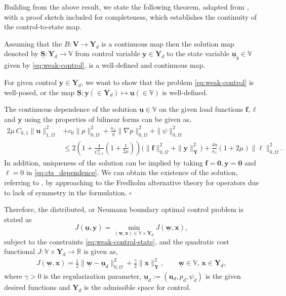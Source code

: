 \documentclass[smallextended]{svjour3}
\renewenvironment{proof}{\noindent{\it Proof.}}{\hfill$\square$}
\numberwithin{equation}{section}
\numberwithin{figure}{section}
\numberwithin{table}{section}
\newcommand{\buS}{\underline{\boldsymbol{S}}}
\newcommand\cero{{\boldsymbol{0}}}
\newcommand\bV{\mathbf{V}}
\newcommand\ff{\boldsymbol{f}}
\newcommand\buu{\underline{\boldsymbol{u}}}
\newcommand\buw{\underline{\boldsymbol{w}}}
\newcommand\bx{\boldsymbol{x}}
\newcommand\by{\boldsymbol{y}}
\newcommand\bu{\boldsymbol{u}}
\newcommand{\bYd}{\boldsymbol{Y}_d}
\newcommand{\bY}{\boldsymbol{Y}}
\newcommand{\bbV}{\mathbb{V}}
\newcommand{\bbR}{\mathbb{R}}
\begin{document}
	

		
	\noindent Building from the above result, we state the following theorem, adapted from \cite{or_sinum16,burger_acom21}, with a proof sketch included for completeness, which establishes the continuity of the control-to-state map.
	\begin{theorem} \label{thm:Gwelldefined}
	Assuming that the $B: \bV \to \bYd$ is a continuous map then the solution map denoted by $\buS: \bYd\to \bbV $ from control variable $\by \in \bYd$ to the state variable $\buu_y \in \bbV$ given by \eqref{eq:weak-control}, is a well-defined and continuous map.
	\end{theorem}
	\begin{proof}
		For given control $\by \in \bYd$, we want to show that the problem \eqref{eq:weak-control} is well-posed, or
        the map $\buS: \by (\in \bYd) \mapsto \buu (\in \bbV)$ is well-defined.
		
		The continuous dependence of the solution $\buu \in \bbV$ on the given load functions $\ff, \ell$ and $\by$ using the properties of bilinear forms can be given as,
		\begin{equation} \label{eq:cts_dependence}
			\begin{aligned}
			2 \mu \, C_{k,1} \| \bu \|_{1, \Omega}^2 &+  c_0 \| p \|_{0, \Omega}^2 + \frac{\kappa_1}{\eta} \| \nabla p \|_{0, \Omega}^2 + \| \psi\|_{0, \Omega}^2 \\
			& \le  2 \left( 1+ \frac{4}{C_{k,1}^2} \left( 1+ \frac{1}{2 \mu} \right)\right) \big( \|\ff \|_{0, \Omega}^2
            + \| \by \|_{\bY}^2 \big)+  \frac{ 4\eta}{\kappa_1} \left( 1+ 2 \mu \right)\| \ell \|_{0, \Omega}^2.
		\end{aligned}
	\end{equation}
		In addition, uniqueness of the solution can be implied by taking $\ff=\cero, \by = \cero$ and $\ell=0$ in \eqref{eq:cts_dependence}. We can obtain the existence of the solution, referring to \cite{or_sinum16}, by approaching to the Fredholm alternative theory for operators due to lack of symmetry in the formulation.
	\end{proof}

Therefore, the distributed, or Neumann boundary optimal control problem is stated as 
\begin{equation}\label{eq:optimal-abstract}
	J(\buu, \by) = \min_{(\buw, \bx) \in \bbV \times \bYd} J(\buw, \bx),
\end{equation}
subject to the constraints \eqref{eq:weak-control-state}, and the quadratic cost functional $J: \bbV \times \bYd \to \bbR$ is given as,
\begin{align*}
	J(\buw, \bx)= \frac{1}{2} \| \buw - \buu_d \|_{0, \Omega}^2 + \frac{\gamma}{2} \| \bx \|_{\bY}^2, \qquad \buw \in \bbV, \, \bx \in \bYd,
\end{align*}
where $\gamma>0$ is the regularization parameter, $\buu_d:=(\bu_d, p_d, \psi_d) $ is the given desired functions and $\bYd$ is the admissible space for control.
\end{document}
